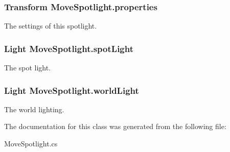 \subsubsection[{properties}]{\setlength{\rightskip}{0pt plus 5cm}Transform Move\+Spotlight.\+properties}\label{class_move_spotlight_a309108521eb846b653863a82aa0e9c84}


The settings of this spotlight. 

\subsubsection[{spot\+Light}]{\setlength{\rightskip}{0pt plus 5cm}Light Move\+Spotlight.\+spot\+Light}\label{class_move_spotlight_a9acaa3e6e3abe611b2212cd2b378fb64}


The spot light. 

\subsubsection[{world\+Light}]{\setlength{\rightskip}{0pt plus 5cm}Light Move\+Spotlight.\+world\+Light}\label{class_move_spotlight_aa255c740ef3a0745b43b027e007bcb62}


The world lighting. 



The documentation for this class was generated from the following file\+:\begin{DoxyCompactItemize}
\item 
Move\+Spotlight.\+cs\end{DoxyCompactItemize}
